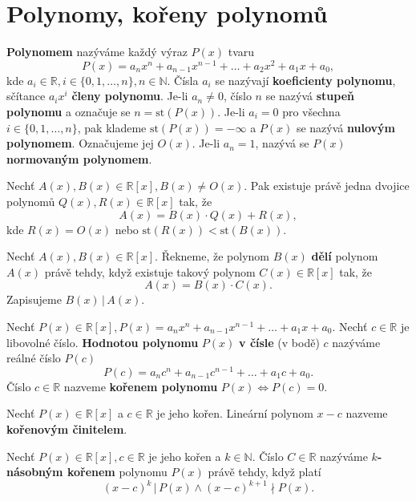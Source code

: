 \section{Polynomy, kořeny polynomů}
\begin{definition}
  \textbf{Polynomem} nazýváme každý výraz $P(x)$ tvaru
  \[
    P(x)=a_nx^n + a_{n-1}x^{n-1}+\dots + a_2x^2+a_1x+a_0,
  \]
  kde $a_i\in \mathbb R, i\in \{ 0,1,\dots , n \},n\in \mathbb N$. Čísla $a_i$ se nazývají \textbf{koeficienty polynomu}, sčítance $a_ix^i$ \textbf{členy polynomu}. Je-li $a_n\ne 0$, číslo $n$ se nazývá \textbf{stupeň polynomu} a označuje se $n= \text{st}(P(x))$. Je-li $a_i=0$ pro všechna $i \in \{ 0,1,\dots ,n\}$, pak klademe $\text{st}(P(x))=-\infty$ a $P(x)$ se nazývá \textbf{nulovým polynomem}. Označujeme jej $O(x).$ Je-li $a_n=1$, nazývá se $P(x)$ \textbf{normovaným polynomem}.
\end{definition}

\begin{veta}
  Nechť $A(x), B(x) \in \mathbb R[x],B(x) \ne O(x).$ Pak existuje právě jedna dvojice polynomů $Q(x),R(x)\in \mathbb R[x]$ tak, že
  \[
    A(x)=B(x)\cdot Q(x)+R(x),
  \]
  kde $R(x)=O(x)$ nebo $\textrm{st}(R(x))<\textrm{st}(B(x)).$
\end{veta}

\begin{definition}
  Nechť $A(x), B(x) \in \mathbb R[x]$. Řekneme, že polynom $B(x)$ \textbf{dělí} polynom $A(x)$ právě tehdy, když existuje takový polynom $C(x) \in \mathbb R[x]$ tak, že
  \[
    A(x) = B(x)\cdot C(x).
  \]
  Zapisujeme $B(x) \, | \, A(x).$
\end{definition}

\begin{definition}
  Nechť $P(x)\in \mathbb R[x], P(x)=a_nx^n+a_{n-1}x^{n-1}+\dots +a_1x+a_0.$ Nechť $c\in \mathbb R$ je libovolné číslo. \textbf{Hodnotou polynomu} $P(x)$ \textbf{v čísle} (v bodě) $c$ nazýváme reálné číslo $P(c)$
  \[
    P(c) = a_nc^n+a_{n-1}c^{n-1}+\dots+a_1c+a_0.
  \]
  Číslo $c\in \mathbb R$ nazveme \textbf{kořenem polynomu} $P(x) \iff P(c) = 0$.
\end{definition}


\begin{definition}
  Nechť $P(x) \in \mathbb R [x]$ a $c\in \mathbb R$ je jeho kořen. Lineární polynom $x-c$ nazveme \textbf{kořenovým činitelem}.
\end{definition}

\begin{definition}
  Nechť $P(x) \in \mathbb R [x], c \in \mathbb R$ je jeho kořen a $k \in \mathbb N$. Číslo $C \in \mathbb R$ nazýváme \textbf{$k$-násobným kořenem} polynomu $P(x)$ právě tehdy, když platí
  \[
    (x-c)^k \, | \, P(x) \land (x-c)^{k+1} \nmid  P(x).
  \]
\end{definition}


